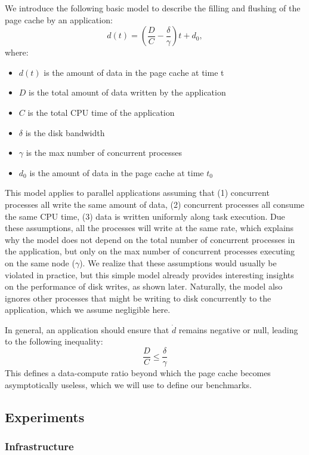 \documentclass{IEEEtran}
\begin{document}
We introduce the following basic model to describe the filling and 
flushing of the page cache by an application:
$$
d(t) = \left( \frac{D}{C} - \frac{\delta}{\gamma} \right)t + d_0,
$$
where:
\begin{itemize}
\item $d(t)$ is the amount of data in the page cache at time t
\item $D$ is the total amount of data written by the application
\item $C$ is the total CPU time of the application
\item $\delta$ is the disk bandwidth
\item $\gamma$ is the max number of concurrent processes
\item $d_0$ is the amount of data in the page cache at time $t_0$
\end{itemize}

This model applies to parallel applications assuming that (1) 
concurrent processes all write the same amount of data, (2) 
concurrent processes all consume the same CPU time, (3) data is written 
uniformly along task execution. Due these assumptions, all the 
processes will write at the same rate, which explains why the model 
does not depend on the total number of concurrent processes in the 
application, but only on the max number of concurrent processes 
executing on the same node ($\gamma$). We realize that these 
assumptions would usually be violated in practice, but this simple 
model already provides interesting insights on the performance of disk 
writes, as shown later. Naturally, the model also ignores other 
processes that might be writing to disk concurrently to the 
application, which we assume negligible here. 

In general, an application should ensure that $\dot d$ remains negative 
or null, leading to the following inequality:
\begin{equation}
\frac{D}{C} \leq \frac{\delta}{\gamma} \label{eq:page-cache-inequality}
\end{equation}
This defines a data-compute ratio beyond which the page cache becomes 
asymptotically useless, which we will use to define our benchmarks.



\subsection{Experiments} %

\subsubsection{Infrastructure} %
\end{document}
